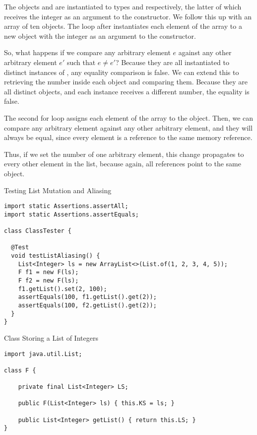 The objects  and  are instantiated to types  and  respectively, the latter of which receives the integer  as an argument to the constructor. We follow this up with an array of ten  objects. The loop after instantiates each element of the array to a new  object with the integer  as an argument to the constructor.

So, what happens if we compare any arbitrary element $e$ against any other arbitrary element $e'$ such that $e \neq e'$? Because they are all instantiated to distinct instances of , any equality comparison is false. We can extend this to retrieving the number inside each  object and comparing them. Because they are all distinct objects, and each  instance receives a different number, the equality is false.

The second for loop assigns each element of the array to the  object. Then, we can compare any arbitrary element against any other arbitrary element, and they will always be equal, since every element is a reference to the same memory reference. 

Thus, if we set the number of one arbitrary element, this change propagates to every other element in the list, because again, all references point to the same object.


\begin{cl}{Testing List Mutation and Aliasing}
\begin{lstlisting}[language=MyJava]
import static Assertions.assertAll;
import static Assertions.assertEquals;

class ClassTester {

  @Test
  void testListAliasing() {
    List<Integer> ls = new ArrayList<>(List.of(1, 2, 3, 4, 5));
    F f1 = new F(ls);
    F f2 = new F(ls);
    f1.getList().set(2, 100);
    assertEquals(100, f1.getList().get(2));
    assertEquals(100, f2.getList().get(2));
  }
}
\end{lstlisting}
\end{cl}

\begin{cl}[F.java]{Class Storing a List of Integers}
\begin{lstlisting}[language=MyJava]
import java.util.List;

class F {
  
    private final List<Integer> LS;
  
    public F(List<Integer> ls) { this.KS = ls; }
  
    public List<Integer> getList() { return this.LS; }
}
\end{lstlisting}
\end{cl}